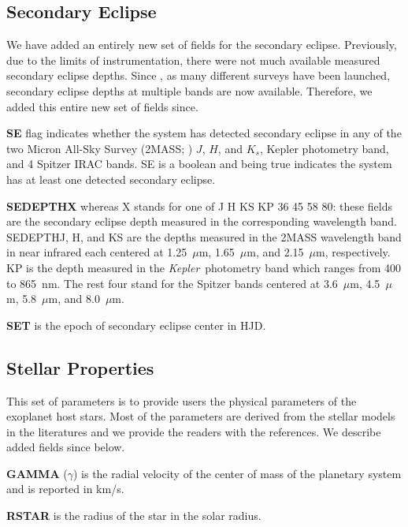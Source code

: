\documentclass[11pt,preprint]{aastex}
\def\micron{$\mu$m}
\def\kepler{\textit{Kepler}}
\def\micron{$\mu$m}
\begin{document}
\begin{CJK*}{UTF8}{gbsn}
\subsection{Secondary Eclipse}

We have added an entirely new set of fields for the secondary
eclipse. Previously, due to the limits of instrumentation, there were
not much available measured secondary eclipse depths. Since
\cite{Wright2011}, as many different surveys have been launched,
secondary eclipse depths at multiple bands are now
available. Therefore, we added this entire new set of fields since.

{\bf SE} flag indicates whether the system has detected secondary
eclipse in any of the two Micron All-Sky Survey (2MASS;
\citealt{Skrustskie2006}) $J$, $H$, and $K_s$, Kepler photometry band,
and 4 Spitzer IRAC bands. SE is a boolean and being true indicates the
system has at least one detected secondary eclipse.

{\bf SEDEPTHX} whereas X stands for one of J H KS KP 36 45 58 80:
these fields are the secondary eclipse depth measured in the
corresponding wavelength band. SEDEPTHJ, H, and KS are the depths
measured in the 2MASS wavelength band in near infrared each centered
at 1.25~\micron, 1.65~\micron, and 2.15~\micron, respectively. KP is
the depth measured in the \kepler\ photometry band which ranges from
400 to 865~nm. The rest four stand for the Spitzer bands centered at
3.6~\micron, 4.5~\micron, 5.8~\micron, and 8.0~\micron.

{\bf SET} is the epoch of secondary eclipse center in HJD.

\subsection{Stellar Properties}
This set of parameters is to provide users the physical parameters of
the exoplanet host stars.  Most of the parameters are derived from the
stellar models in the literatures and we provide the readers with the
references. We describe added fields since \cite{Wright2011} below.

{\bf GAMMA} ($\gamma$) is the radial velocity of the center of mass of
the planetary system and is reported in km/s.

{\bf RSTAR} is the radius of the star in the solar radius.


\end{CJK*}
\end{document}

